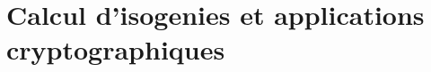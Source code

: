 \newcommand{\clot}[1]{\bar{#1}}  %
\newcommand{\card}[1]{\# #1}  %
\newcommand{\LK}{\mathbb{L}}  %
\newcommand{\U}{\mathbb{U}}  %
\newcommand{\isom}{\cong}  %
\newcommand{\frob}{\varphi}  %
\newcommand{\res}{\rho}  %
\newcommand{\euler}{\phi}  %
\newcommand{\Cyclo}{\Phi}  %
\newcommand{\Proj}{\mathbb{P}}  %
\newcommand{\0}{\mathcal{O}}  %
\newcommand{\ecpoint}[3]{[#1:#2:#3]}  %
\newcommand{\isog}[1]{\mathcal{#1}}  %
\newcommand{\I}{\isog{I}}  %
\newcommand{\frobisog}{\phi}  %
\newcommand{\Hasse}{H}  %
\newcommand{\divpol}{f}  %
\newcommand{\tildO}{\tilde{O}}  %
\newcommand{\Mult}{\mathrm{\sf M}}  %
\newcommand{\ModComp}{\mathrm{\sf C}}  %
\newcommand{\alg}[1]{{\sf #1}}  %
\newcommand{\algref}[1]{\alg{\ref{#1}}}  %
\newcommand{\wrt}{\dashv}  %
\newcommand{\ndiv}{\nmid}  %


\part{Calcul d'isogenies et applications cryptographiques}











%

